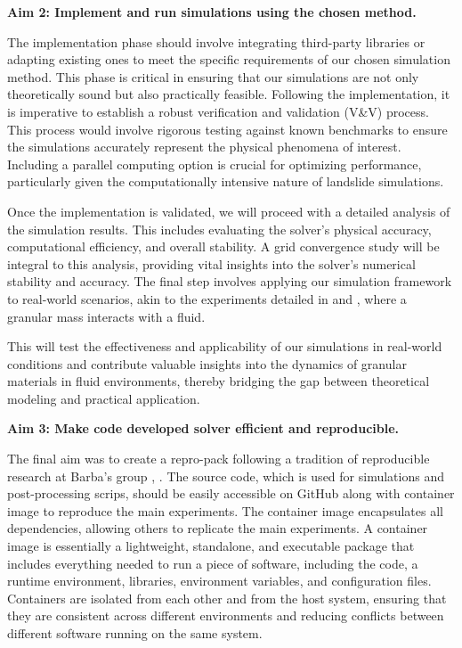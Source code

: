 \textbf{Aim 2: Implement and run simulations using the chosen method.} 

The implementation phase should involve integrating third-party libraries or adapting existing ones to meet the specific requirements of our chosen simulation method. This phase is critical in ensuring that our simulations are not only theoretically sound but also practically feasible. Following the implementation, it is imperative to establish a robust verification and validation (\ac{V&V}) process. This process would involve rigorous testing against known benchmarks to ensure the simulations accurately represent the physical phenomena of interest. Including a parallel computing option is crucial for optimizing performance, particularly given the computationally intensive nature of landslide simulations.

Once the implementation is validated, we will proceed with a detailed analysis of the simulation results. This includes evaluating the solver's physical accuracy, computational efficiency, and overall stability. A grid convergence study will be integral to this analysis, providing vital insights into the solver's numerical stability and accuracy.
The final step involves applying our simulation framework to real-world scenarios, akin to the experiments detailed in \cite{mao2020resolved} and \cite{shen2022resolved}, where a granular mass interacts with a fluid. 

This will test the effectiveness and applicability of our simulations in real-world conditions and contribute valuable insights into the dynamics of granular materials in fluid environments, thereby bridging the gap between theoretical modeling and practical application.

\textbf{Aim 3: Make code developed solver efficient and reproducible.}

The final aim was to create a repro-pack following a tradition of reproducible research at Barba's group \cite{barba2018terminologies}, \cite{Mesnard2023}. The source code, which is used for simulations and post-processing scrips, should be easily accessible on GitHub \cite{github} along with container image \cite{Docker_introduction} to reproduce the main experiments. The container image encapsulates all dependencies, allowing others to replicate the main experiments. A container image is essentially a lightweight, standalone, and executable package that includes everything needed to run a piece of software, including the code, a runtime environment, libraries, environment variables, and configuration files. Containers are isolated from each other and from the host system, ensuring that they are consistent across different environments and reducing conflicts between different software running on the same system.

